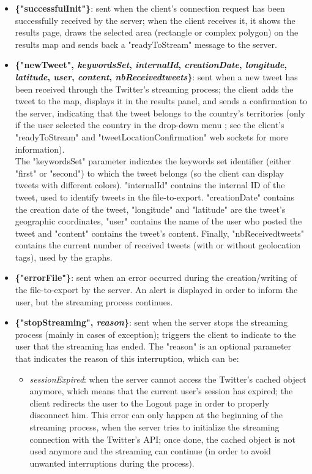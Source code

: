 \documentclass[a4paper,11pt]{report}
\begin{document}
\begin{itemize}
	\item \textbf{\{"successfulInit"\}}: sent when the client's connection request has been successfully received by the server; when the client receives it, it shows the results page, draws the selected area (rectangle or complex polygon) on the results map and sends back a "readyToStream" message to the server.
	\newpage
	
	\item \textbf{\{"newTweet", \textit{keywordsSet}, \textit{internalId}, \textit{creationDate}, \textit{longitude}, \textit{latitude}, \textit{user}, \textit{content}, \textit{nbReceivedtweets}\}}: sent when a new tweet has been received through the Twitter's streaming process; the client adds the tweet to the map, displays it in the results panel, and sends a confirmation to the server, indicating that the tweet belongs to the country's territories (only if the user selected the country in the drop-down menu ; see the client's "readyToStream" and "tweetLocationConfirmation" web sockets for more information).\\The "keywordsSet" parameter indicates the keywords set identifier (either "first" or "second") to which the tweet belongs (so the client can display tweets with different colors). "internalId" contains the internal ID of the tweet, used to identify tweets in the file-to-export. "creationDate" contains the creation date of the tweet, "longitude" and "latitude" are the tweet's geographic coordinates, "user" contains the name of the user who posted the tweet and "content" contains the tweet's content. Finally, "nbReceivedtweets" contains the current number of received tweets (with or without geolocation tags), used by the graphs.
	\item \textbf{\{"errorFile"\}}: sent when an error occurred during the creation/writing of the file-to-export by the server. An alert is displayed in order to inform the user, but the streaming process continues.
	\item \textbf{\{"stopStreaming", \textit{reason}\}}: sent when the server stops the streaming process (mainly in cases of exception); triggers the client to indicate to the user that the streaming has ended. The "reason" is an optional parameter that indicates the reason of this interruption, which can be:
	\begin{itemize}
		\item \emph{sessionExpired}: when the server cannot access the Twitter's cached object anymore, which means that the current user's session has expired; the client redirects the user to the Logout page in order to properly disconnect him. This error can only happen at the beginning of the streaming process, when the server tries to initialize the streaming connection with the Twitter's API; once done, the cached object is not used anymore and the streaming can continue (in order to avoid unwanted interruptions during the process).

\end{itemize}
\end{itemize}
\end{document}
